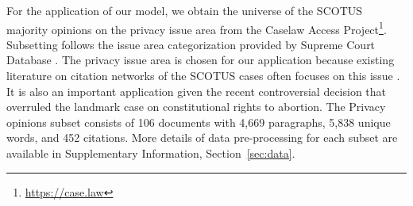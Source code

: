 For the application of our model, we obtain the universe of the SCOTUS majority opinions on the privacy issue area from the Caselaw Access Project\footnote{\url{https://case.law}}.
Subsetting follows the issue area categorization provided by Supreme Court Database \citep{scdb}. 
The privacy issue area is chosen for our application because existing literature on citation networks of the SCOTUS cases often focuses on this issue \citep{fowler2007network, clark2012genealogy}.
It is also an important application given the recent controversial decision that overruled the landmark case on constitutional rights to abortion. 
The Privacy opinions subset consists of 106 documents with 4,669 paragraphs, 5,838 unique words, and 452 citations.
More details of data pre-processing for each subset are available in Supplementary Information, Section~\ref{sec:data}.

